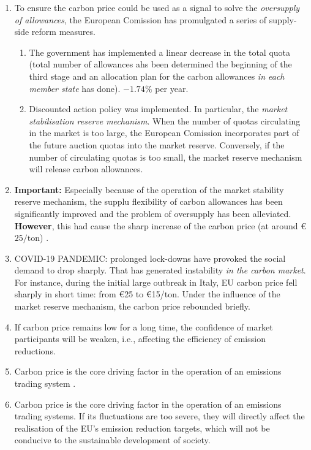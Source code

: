 \begin{enumerate}[wide, itemsep=0cm, topsep=0cm, label=\textbf{\arabic{enumi}.}]
	\item To ensure the carbon price could be used as a signal to solve the \emph{oversupply of allowances}, the European Comission has promulgated a series of supply-side reform measures.
	\begin{enumerate}[wide, itemsep=0cm, topsep=0cm, label=\textbf{(\alph{enumii})}, labelindent=1cm]
		\item The government has implemented a linear decrease in the total quota (total number of allowances ahs been determined the beginning of the third stage and an allocation plan for the carbon allowances \emph{in each member state} has done). $-1.74\%$ per year. 
		\item Discounted action policy was implemented. In particular, the \emph{market stabilisation reserve mechanism}. When the number of quotas circulating in the market is too large, the European Comission incorporates part of the future auction quotas into the market reserve. Conversely, if the number of circulating quotas is too small, the market reserve mechanism will release carbon allowances. \cite{richstein2015market} 
	\end{enumerate}
	\item \textbf{Important:} Especially because of the operation of the market stability reserve mechanism, the supplu flexibility of carbon allowances has been significantly improved and the problem of oversupply has been alleviated. \textbf{However}, this had cause the sharp increase of the carbon price (at around \euro$25/\text{ton}$) \cite{dong2022exploring}.
	\item COVID-19 PANDEMIC: prolonged lock-downs have provoked the social demand to drop sharply. That has generated instability \emph{in the carbon market}. For instance, during the initial large outbreak in Italy, EU carbon price fell sharply in short time: from \euro25 to \euro15/ton. Under the influence of the market reserve mechanism, the carbon price rebounded briefly. \cite{gerlagh2020covid}
	\item If carbon price remains low for a long time, the confidence of market participants will be weaken, i.e., affecting the efficiency of emission reductions.
	\item Carbon price is the core driving factor in the operation of an emissions trading system \cite{dong2022exploring}.
	\item Carbon price is the core driving factor in the operation of an emissions trading systems. If its fluctuations are too severe, they will directly affect the realisation of the EU's emission reduction targets, which will not be conducive to the sustainable development of society.

\end{enumerate}
